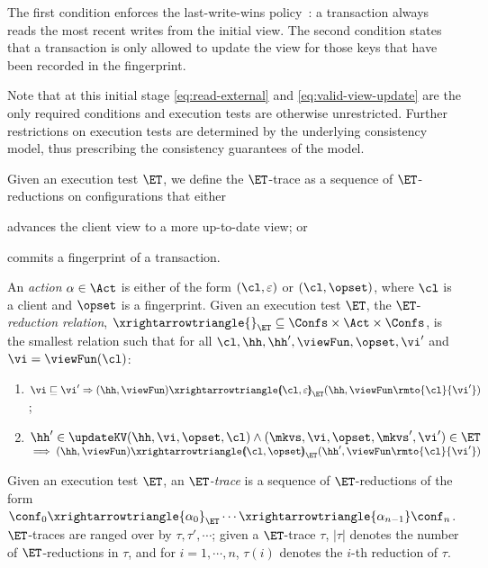 %
\noindent 
The first condition enforces the last-write-wins policy~\cite{vogels:2009:ec:1435417.1435432}: 
a transaction always reads the most recent writes from the initial view.  
The second condition states that a transaction is only allowed to update the view for those keys 
that have been recorded in the fingerprint.  

Note that at this initial stage \eqref{eq:read-external} and \eqref{eq:valid-view-update} are the only required conditions and execution tests are otherwise unrestricted. 
Further restrictions on execution tests are determined by the underlying consistency model, thus prescribing the consistency guarantees of the model.

Given an execution test  $\ET$, we define the $\ET$-trace as a sequence of $\ET$-reductions on configurations that either 
\begin{enumerate*}
	\item advances the client view to a more up-to-date view; or 
	\item commits a fingerprint of a transaction. 
\end{enumerate*}

\begin{definition}[$\ET$-trace]
\label{def:reduction}
An \emph{action} $\alpha \in \Act$ is either of the form $(\cl, \varepsilon)$ or $(\cl, \opset)$, 
where $\cl$ is a client and $\opset$ is a fingerprint. 
Given an execution test $\ET$, the $\ET$-\emph{reduction relation},
$\xrightarrowtriangle{}_{\ET} \subseteq \Confs \times \Act \times \Confs$, 
is the smallest relation such that for all $\cl, \hh, \hh', \viewFun, \opset, \vi'$ and $\vi = \viewFun(\cl)$:
{\small
\begin{enumerate}
	\item
    $\vi \sqsubseteq \vi'
    \Rightarrow
    (\hh, \viewFun) \xrightarrowtriangle{\hspace{-5pt}(\cl, \varepsilon)\hspace{-5pt}}_{\ET} 
    (\hh, \viewFun\rmto{\cl}{\vi'})$; 
	\item 
    $\hh' \in \updateKV(\hh, \vi , \opset, \cl)
     \wedge (\mkvs, \vi, \opset, \mkvs', \vi') \in \ET
	$  \\
	\phantom{a} \hfill $\implies (\hh, \viewFun) \xrightarrowtriangle{\hspace{-5pt}(\cl, \opset)\hspace{-5pt}}_{\ET} (\hh', \viewFun\rmto{\cl}{\vi'})$
\end{enumerate}
}
Given an execution test $\ET$, an \emph{$\ET$-trace} is a sequence of $\ET$-reductions of the form $\conf_{0} \xrightarrowtriangle{\alpha_{0}}_{\ET} \cdots 
\xrightarrowtriangle{\alpha_{n-1}} \conf_{n}$. $\ET$-traces are ranged over by $\tau, \tau', \cdots$; 
given a $\ET$-trace $\tau$, $\lvert \tau \rvert$ denotes the number of $\ET$-reductions in $\tau$, and 
for $i=1,\cdots,n$, $\tau(i)$ denotes the $i$-th reduction of $\tau$.
\end{definition}

